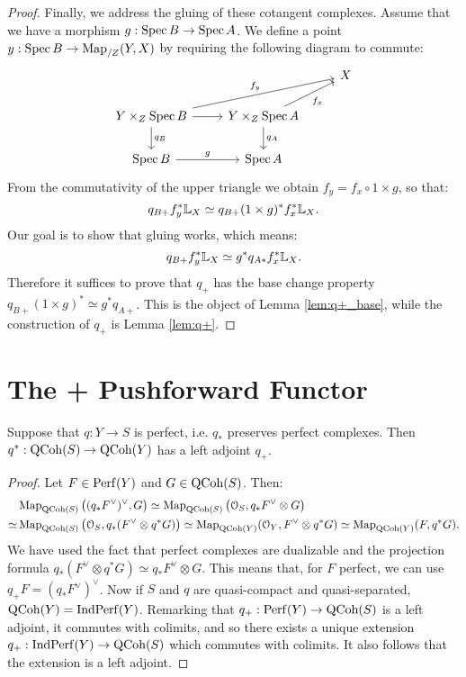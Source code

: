 \begin{proof}
Finally, we address the gluing of these cotangent complexes. Assume that we have a morphism $g: \operatorname{Spec} B \to \operatorname{Spec} A$. We define
a point $y: \operatorname{Spec} B \to \operatorname{Map}_{/Z}(Y,X)$ by requiring the following diagram to commute:
\[
\begin{tikzcd}
\; & & X \\
Y \times_Z \Spec B \arrow{r} \arrow{d}{q_B} \arrow{urr}{f_y} & Y\times_Z \Spec A \arrow{d}{q_A}\arrow[swap]{ur}{f_x} & \\
\Spec B\arrow{r}{g} & \Spec A &
\end{tikzcd}
\]
From the commutativity of the upper triangle we obtain $f_y = f_x \circ 1\times g$, so that:
\[	q_{B+} f_y^* \mathbb L_X \simeq q_{B+}(1\times g)^*f_x^*\mathbb L_X .	\]
Our goal is to show that gluing works, which means:
\[	q_{B+} f_y^* \mathbb L_X \simeq g^* q_{A*} f_x^* \mathbb L_X.	\]
Therefore it suffices to prove that $q_+$ has the base change property $q_{B+}(1\times g)^* \simeq g^* q_{A+}$. This
is the object of Lemma \ref{lem:q+_base}, while the construction of $q_+$ is Lemma \ref{lem:q+}.
\end{proof}




\section{The + Pushforward Functor}

\begin{lem}
\label{lem:q+}
Suppose that $q: Y \to S$ is perfect, i.e. $q_*$ preserves perfect complexes. Then $q^* : \mathrm{QCoh}(S) \to \mathrm{QCoh}(Y)$ has a left
adjoint $q_+$.
\end{lem}
\begin{proof}
Let $F \in \mathrm{Perf}(Y)$ and $G \in \mathrm{QCoh}(S)$. Then:
\begin{align*}
	&\operatorname{Map}_{\mathrm{QCoh}(S)} \big( (q_*F^{\vee})^{\vee}, G\big) \simeq \operatorname{Map}_{\mathrm{QCoh}(S)} \big( \mathcal{O}_S, q_*F^{\vee} \otimes G\big) \\
\simeq& \operatorname{Map}_{\mathrm{QCoh}(S)} \big(\mathcal{O}_S, q_*(F^{\vee} \otimes q^* G)  \big) \simeq \operatorname{Map}_{\mathrm{QCoh}(Y)}(\mathcal{O}_Y,F^{\vee} \otimes q^*G)
 \simeq \operatorname{Map}_{\mathrm{QCoh}(Y)}(F,q^*G).
\end{align*}
We have used the fact that perfect complexes are dualizable and the projection formula $q_*(F^{\vee} \otimes q^* G)
\simeq q_*F^{\vee} \otimes G$. This means that, for $F$ perfect, we can use $q_+F = (q_*F^{\vee})^{\vee}$. Now if $S$ and $q$
are quasi-compact and quasi-separated, $\mathrm{QCoh}(Y) = \mathrm{Ind} \mathrm{Perf}(Y)$. Remarking that $q_+ : \mathrm{Perf}(Y) \to \mathrm{QCoh}(S)$ is a left
adjoint, it commutes with colimits, and so there exists a unique extension $q_+ : \mathrm{Ind} \mathrm{Perf}(Y) \to \mathrm{QCoh}(S)$ which commutes with
colimits. It also follows that the extension is a left adjoint.
\end{proof}

